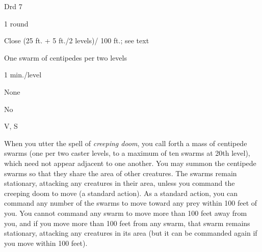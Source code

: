
\begin{description*}
\item[Level:] Drd 7
\item[Casting Time:] 1 round
\item[Range:] Close (25 ft. + 5 ft./2 levels)/ 100 ft.; see text
\item[Effect:] One swarm of centipedes per two levels
\item[Duration:] 1 min./level
\item[Saving Throw:] None
\item[Spell Resistance:] No
\item[Components:] V, S
\end{description*}

When you utter the spell of \textit{creeping doom}, you call forth a mass of centipede
swarms (one per two caster levels, to a maximum of ten swarms at 20th level), which
need not appear adjacent to one another.
You may summon the centipede swarms so that they share the area of other creatures.
The swarms remain stationary, attacking any creatures in their area, unless you
command the creeping doom to move (a standard action). As a standard action, you
can command any number of the swarms to move toward any prey within 100 feet of
you. You cannot command any swarm to move more than 100 feet away from you, and
if you move more than 100 feet from any swarm, that swarm remains stationary, attacking
any creatures in its area (but it can be commanded again if you move within 100
feet).